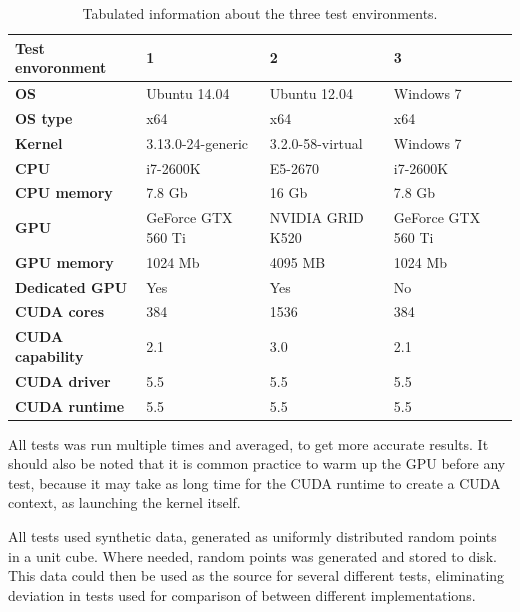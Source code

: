 \begin{table}[ht]
\centering
    \begin{tabular}{|l|l|l|l|}
        \hline
        \textbf{Test envoronment} & \textbf{1}         & \textbf{2}       & \textbf{3}\\ \hline
        \textbf{OS}               & Ubuntu 14.04       & Ubuntu 12.04     & Windows 7  \\ \hline
        \textbf{OS type}          & x64                & x64              & x64     \\ \hline
        \textbf{Kernel}           & 3.13.0-24-generic  & 3.2.0-58-virtual & Windows 7      \\ \hline
        \textbf{CPU}              & i7-2600K           & E5-2670          & i7-2600K       \\ \hline
        \textbf{CPU memory}       & 7.8 Gb             & 16 Gb            & 7.8 Gb \\ \hline
        \textbf{GPU}              & GeForce GTX 560 Ti & NVIDIA GRID K520 & GeForce GTX 560 Ti      \\ \hline
        \textbf{GPU memory}       & 1024 Mb            & 4095 MB          & 1024 Mb      \\ \hline
        \textbf{Dedicated GPU}    & Yes                & Yes              & No       \\ \hline
        \textbf{CUDA cores}       & 384                & 1536             & 384       \\ \hline
        \textbf{CUDA capability}  & 2.1                & 3.0              & 2.1       \\ \hline
        \textbf{CUDA driver}      & 5.5                & 5.5              & 5.5       \\ \hline
        \textbf{CUDA runtime}     & 5.5                & 5.5              & 5.5       \\ \hline
    \end{tabular}
    \caption{Tabulated information about the three test environments.}
    \label{tbl:test_envoronments}
\end{table}

All tests was run multiple times and averaged, to get more accurate results. It should also be noted that it is common practice to warm up the GPU before any test, because it may take as long time for the CUDA runtime to create a CUDA context, as launching the kernel itself.

All tests used synthetic data, generated as uniformly distributed random points in a unit cube. Where needed, random points was generated and stored to disk. This data could then be used as the source for several different tests, eliminating deviation in tests used for comparison of between different implementations.

